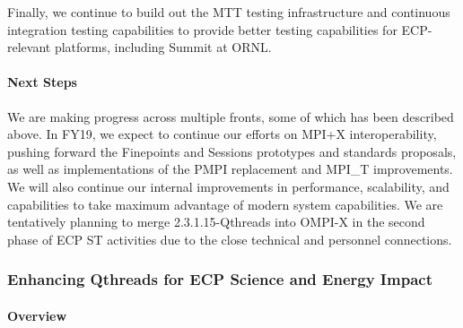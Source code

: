 
%
Finally, we continue to build out the MTT testing infrastructure and
continuous integration testing capabilities to provide better testing
capabilities for ECP-relevant platforms, including Summit at ORNL.

\paragraph{Next Steps}
We are making progress across multiple fronts, some of which has been
described above.  In FY19, we expect to continue our efforts on MPI+X
interoperability, pushing forward the Finepoints and Sessions
prototypes and standards proposals, as well as implementations of the
PMPI replacement and MPI\_T improvements.  We will also continue our
internal improvements in performance, scalability, and capabilities to
take maximum advantage of modern system capabilities. We are
tentatively planning to merge 2.3.1.15-Qthreads into OMPI-X in the
second phase of ECP ST activities due to the close technical and
personnel connections.
\subsubsection{ Enhancing Qthreads for ECP Science and Energy Impact} 


\paragraph{Overview} 


